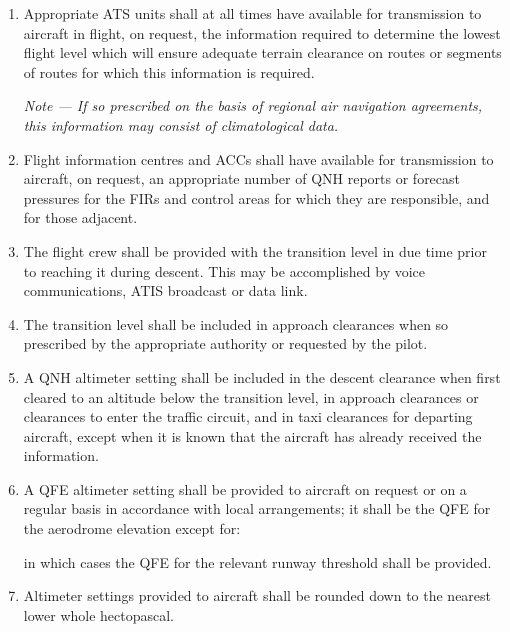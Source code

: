 \documentclass[../main.tex]{subfiles}
\begin{document}
    \begin{enumerate}
        \item Appropriate ATS units shall at all times have available for transmission to aircraft in flight, on request, the information required to determine the lowest flight level which will ensure adequate terrain clearance on routes or segments of routes for which this information is required.

        \textit{Note --- If so prescribed on the basis of regional air navigation agreements, this information may consist of climatological data.}

        \item Flight information centres and ACCs shall have available for transmission to aircraft, on request, an appropriate number of QNH reports or forecast pressures for the FIRs and control areas for which they are responsible, and for those adjacent.
        \item The flight crew shall be provided with the transition level in due time prior to reaching it during descent. This may be accomplished by voice communications, ATIS broadcast or data link.
        \item The transition level shall be included in approach clearances when so prescribed by the appropriate authority or requested by the pilot.
        \item A QNH altimeter setting shall be included in the descent clearance when first cleared to an altitude below the transition level, in approach clearances or clearances to enter the traffic circuit, and in taxi clearances for departing aircraft, except when it is known that the aircraft has already received the information.
        \item A QFE altimeter setting shall be provided to aircraft on request or on a regular basis in accordance with local arrangements; it shall be the QFE for the aerodrome elevation except for:


        \noindent in which cases the QFE for the relevant runway threshold shall be provided.

        \item Altimeter settings provided to aircraft shall be rounded down to the nearest lower whole hectopascal.


\end{enumerate}
\end{document}
